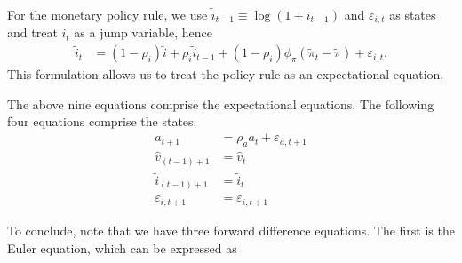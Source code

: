 \documentclass[12 pt, oneside]{article}
\theoremstyle{definition}
\theoremstyle{definition}
\theoremstyle{definition}
\newcommand{\fd}{\vspace{2.5mm}}
\begin{document}
\fd

For the monetary policy rule, we use $\tilde{i}_{t - 1} \equiv \log(1 + i_{t - 1})$ and $\varepsilon_{i, t}$ as states and treat $i_t$ as a jump variable, hence
\begin{align*}
  \tilde{i}_t & = (1 - \rho_i) \tilde{i} + \rho_i \tilde{i}_{t - 1} + (1 - \rho_i)\phi_\pi (\tilde{\pi}_t - \tilde{\pi})  + \varepsilon_{i, t}.
\end{align*}
This formulation allows us to treat the policy rule as an expectational equation.

\fd

The above nine equations comprise the expectational equations. The following four equations comprise the states:
\begin{align*}
  a_{t + 1} & = \rho_a a_t + \varepsilon_{a, t + 1}\\
  \hat{v}_{(t - 1) + 1} & = \hat{v}_t\\
  \tilde{i}_{(t - 1) + 1} & = \tilde{i}_t\\
  \varepsilon_{i, t + 1} & = \varepsilon_{i, t + 1}
\end{align*}


To conclude, note that we have three forward difference equations. The first is the Euler equation, which can be expressed as
\end{document}
